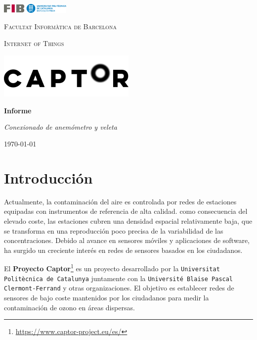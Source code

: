\documentclass[a4paper, 11pt]{article}
\begin{document}
\begin{titlepage}
	\centering
	\includegraphics[width=0.25\textwidth]{fib.png}\par
	\vspace{2cm}
	{\scshape\LARGE Facultat Informàtica de Barcelona \par}
	\vspace{1cm}
	{\scshape\Large Internet of Things\par}
	\vspace{1cm}
	\includegraphics[width=0.5\textwidth]{../logo.png}\par
	\vspace{0.5cm}
	{\huge\bfseries Informe\par}
	\vspace{0.5cm}
	{\Large\itshape Conexionado de anemómetro y veleta\par}
	\vspace{2cm}
	{\large \today\par}
\end{titlepage}
\newpage

\tableofcontents
\newpage

\listoffigures
\listoftables
\newpage

\section{Introducción}
Actualmente, la contaminación del aire es controlada por redes de estaciones equipadas con instrumentos de referencia de alta calidad. como consecuencia del elevado coste, las estaciones cubren una densidad espacial relativamente baja, que se transforma en una reproducción poco precisa de la variabilidad de las concentraciones. Debido al avance en sensores móviles y aplicaciones de software, ha surgido un creciente  interés en redes de sensores basados en los ciudadanos.

El \textbf{Proyecto Captor}\footnote{\url{https://www.captor-project.eu/es/}} es un proyecto desarrollado por la \texttt{Universitat Politècnica de Catalunya} juntamente con la \texttt{Université Blaise Pascal Clermont-Ferrand} y otras organizaciones. El objetivo es establecer redes de sensores de bajo coste mantenidos por los ciudadanos para medir la contaminación de ozono en áreas dispersas.
\end{document}
